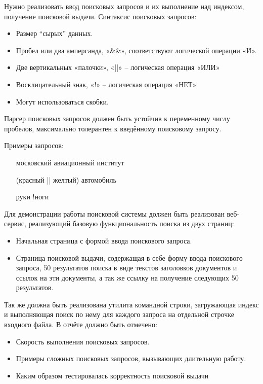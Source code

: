 Нужно реализовать ввод поисковых запросов и их выполнение над индексом, получение
поисковой выдачи.
Синтаксис поисковых запросов:

\begin{itemize}
\item Размер \enquote{сырых} данных.
\item Пробел или два амперсанда, «\&\&», соответствуют логической операции «И».
\item Две вертикальных «палочки», «||» – логическая операция «ИЛИ»
\item Восклицательный знак, «!» – логическая операция «НЕТ»
\item Могут использоваться скобки.
\end{itemize}

Парсер поисковых запросов должен быть устойчив к переменному числу пробелов, максимально
толерантен к введённому поисковому запросу.

Примеры запросов:
\begin{itemize}
\item [ московский авиационный институт ]
\item  [ (красный || желтый) автомобиль ]
\item [ руки !ноги ]
\end{itemize}

Для демонстрации работы поисковой системы должен быть реализован веб-сервис, реализующий
базовую функциональность поиска из двух страниц:
\begin{itemize}
    \item  Начальная страница с формой ввода поискового запроса.
    \item  Страница поисковой выдачи, содержащая в себе форму ввода поискового запроса, 50 результатов поиска в виде текстов заголовков документов и ссылок на эти документы, а так же ссылку на получение следующих 50 результатов.
\end{itemize}
Так же должна быть реализована утилита командной строки, загружающая индекс и
выполняющая поиск по нему для каждого запроса на отдельной строчке входного файла.
В отчёте должно быть отмечено:
\begin{itemize}
    \item  Скорость выполнения поисковых запросов.
    \item  Примеры сложных поисковых запросов, вызывающих длительную работу.
    \item  Каким образом тестировалась корректность поисковой выдачи
\end{itemize}

\pagebreak
